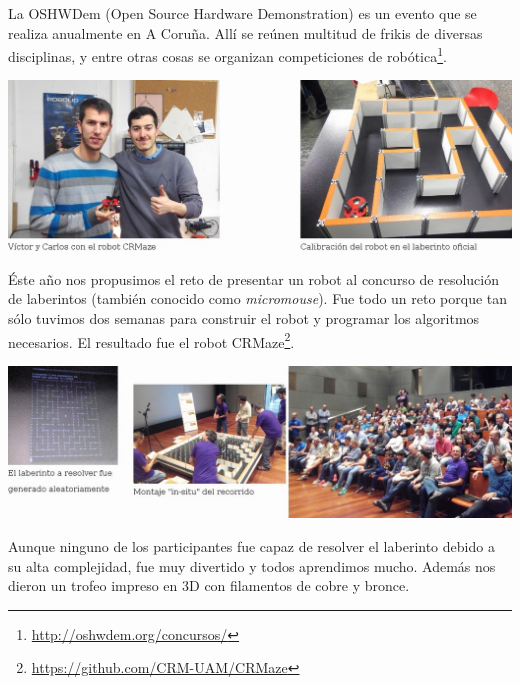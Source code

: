 \documentclass[12pt,twoside]{report}
\begin{document}
La OSHWDem (Open Source Hardware Demonstration) es un evento que se realiza anualmente en A Coruña. Allí se reúnen multitud de frikis de diversas disciplinas, y entre otras cosas se organizan competiciones de robótica\footnote{\url{http://oshwdem.org/concursos/}}.

\vspace{5mm}

\centerline{\includegraphics[width=1.1\linewidth]{fotos/oshwdem2015_robot}}

Éste año nos propusimos el reto de presentar un robot al concurso de resolución de laberintos (también conocido como \emph{micromouse}). Fue todo un reto porque tan sólo tuvimos dos semanas para construir el robot y programar los algoritmos necesarios.
El resultado fue el robot CRMaze\footnote{\url{https://github.com/CRM-UAM/CRMaze}}.


\vspace{5mm}
\centerline{\includegraphics[width=1.1\linewidth]{fotos/oshwdem2015_laberinto}}


Aunque ninguno de los participantes fue capaz de resolver el laberinto debido a su alta complejidad, fue muy divertido y todos aprendimos mucho. Además nos dieron un trofeo impreso en 3D con filamentos de cobre y bronce.
\end{document}
